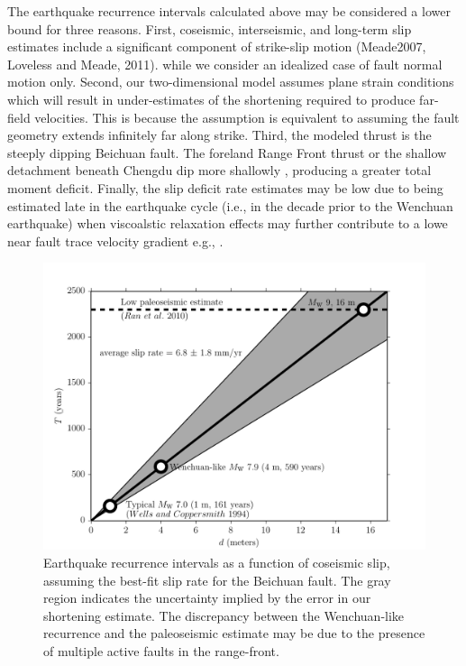 \documentclass[12pt]{article}
\begin{document}
The earthquake recurrence intervals calculated above may be considered a lower bound for three reasons.  First, coseismic, interseismic, and long-term slip estimates include a significant component of strike-slip motion \citep{Shen2009, Qi2011, Densmore2007} (Meade2007, Loveless and Meade, 2011). while we consider an idealized case of fault normal motion only. Second, our two-dimensional model assumes plane strain conditions which will result in under-estimates of the shortening required to produce far-field velocities. This is because the assumption is equivalent to assuming the fault geometry extends infinitely far along strike. Third, the modeled thrust is the steeply dipping Beichuan fault. The foreland Range Front thrust or the shallow detachment beneath Chengdu dip more shallowly \citep{Hubbard2010}, producing a greater total moment deficit.  Finally, the slip deficit rate estimates may be low due to being estimated late in the earthquake cycle (i.e., in the decade prior to the Wenchuan earthquake) when viscoalstic relaxation effects may further contribute to a lowe near fault trace velocity gradient e.g., \citep{savage00}.

\begin{figure}[h!]
    \centering
    \includegraphics{figs/hazard_all_details.pdf}
    \caption{Earthquake recurrence intervals as a function of coseismic slip, assuming the best-fit slip rate for the Beichuan fault. The gray region indicates the uncertainty implied by the error in our shortening estimate. The discrepancy between the Wenchuan-like recurrence and the paleoseismic estimate may be due to the presence of multiple active faults in the range-front.}
    \label{fig:hazard}
\end{figure}
\end{document}
